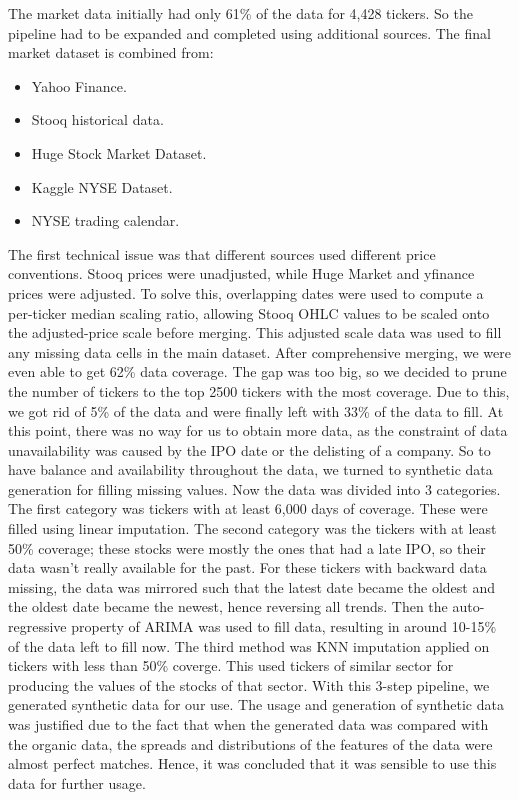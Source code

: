 \documentclass[conference]{IEEEtran}
\begin{document}
The market data initially had only 61\% of the data for 4,428 tickers. So the pipeline had to be expanded and completed using additional sources. The final market dataset is combined from:
\begin{itemize}
    \item Yahoo Finance.\cite{yahooFinance}
    \item Stooq historical data.\cite{stooq}
    \item Huge Stock Market Dataset.\cite{hugeMarket}
    \item Kaggle NYSE Dataset.\cite{nyseKaggle}
    \item NYSE trading calendar.%
\end{itemize}
The first technical issue was that different sources used different price conventions. Stooq prices were unadjusted, while Huge Market and yfinance prices were adjusted. To solve this, overlapping dates were used to compute a per-ticker median scaling ratio, allowing Stooq OHLC values to be scaled onto the adjusted-price scale before merging. This adjusted scale data was used to fill any missing data cells in the main dataset. After comprehensive merging, we were even able to get 62\% data coverage. The gap was too big, so we decided to prune the number of tickers to the top 2500 tickers with the most coverage. Due to this, we got rid of 5\% of the data and were finally left with 33\% of the data to fill. At this point, there was no way for us to obtain more data, as the constraint of data unavailability was caused by the IPO date or the delisting of a company. So to have balance and availability throughout the data, we turned to synthetic data generation for filling missing values. Now the data was divided into 3 categories. The first category was tickers with at least 6,000 days of coverage. These were filled using linear imputation. The second category was the tickers with at least 50\% coverage; these stocks were mostly the ones that had a late IPO, so their data wasn't really available for the past. For these tickers with backward data missing, the data was mirrored such that the latest date became the oldest and the oldest date became the newest, hence reversing all trends. Then the auto-regressive property of ARIMA was used to fill data, resulting in around 10-15\% of the data left to fill now. The third method was KNN imputation applied on tickers with less than 50\% coverge. This used tickers of similar sector for producing the values of the stocks of that sector. With this 3-step pipeline, we generated synthetic data for our use. The usage and generation of synthetic data was justified due to the fact that when the generated data was compared with the organic data, the spreads and distributions of the features of the data were almost perfect matches. Hence, it was concluded that it was sensible to use this data for further usage.
\end{document}
